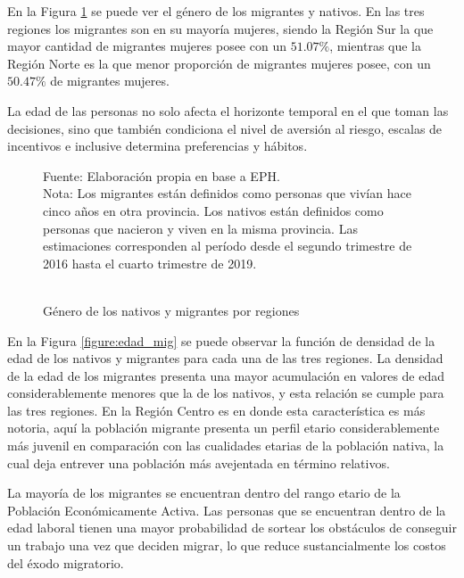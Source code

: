 \documentclass[12pt,a4paper]{article}
\begin{document}
En la Figura \ref{figure:sexo_mig_} se puede ver el género de los migrantes y nativos. En las tres regiones los migrantes son en su mayoría mujeres, siendo la Región Sur la que mayor cantidad de migrantes mujeres posee con un $51.07\%$, mientras que la Región Norte es la que menor proporción de migrantes mujeres posee, con un $50.47\%$ de migrantes mujeres.

La edad de las personas no solo afecta el horizonte temporal en el que toman las decisiones, sino que también condiciona el nivel de aversión al riesgo, escalas de incentivos e inclusive determina preferencias y hábitos.

\begin{figure}[ht!]
\begin{center}
 	\caption{\\Género de los nativos y migrantes por regiones}
 
 	\label{figure:sexo_mig_}
\begin{flushleft}
\begin{scriptsize}
Fuente: Elaboración propia en base a EPH.\\
Nota: Los migrantes están definidos como personas que vivían hace cinco años en otra provincia. Los nativos están definidos como personas que nacieron y viven en la misma provincia. Las estimaciones corresponden al período desde el segundo trimestre de 2016 hasta el cuarto trimestre de 2019.\\
\end{scriptsize}
\end{flushleft}
\end{center}
\end{figure}
\newpage


En la Figura \ref{figure:edad_mig} se puede observar la función de densidad de la edad de los nativos y migrantes para cada una de las tres regiones. La densidad de la edad de los migrantes presenta una mayor acumulación en valores de edad considerablemente menores que la de los nativos, y esta relación se cumple para las tres regiones. En la Región Centro es en donde esta característica es más notoria, aquí la población migrante presenta un perfil etario considerablemente más juvenil en comparación con las cualidades etarias de la población nativa, la cual deja entrever una población más avejentada en término relativos.

La mayoría de los migrantes se encuentran dentro del rango etario de la Población Económicamente Activa. Las personas que se encuentran dentro de la edad laboral tienen una mayor probabilidad de sortear los obstáculos de conseguir un trabajo una vez que deciden migrar, lo que reduce sustancialmente los costos del éxodo migratorio.
\end{document}
